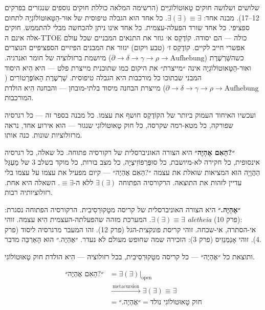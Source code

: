 \documentclass[10pt, openany, oneside]{book}
\begin{document}
\vspace{0.8em}

\noindent שלושים ושלושה חוקים טָאוּטוֹלוֹגִיִּים (הרשימה המלאה כוללת חוקים נוספים שנגזרים בפרקים 12–17). מבנה אחד: $\exists(\exists) \equiv \exists$. כל אחד הוא הגבלה טיפוסית של אוּר-הַטָּאוּטוֹלוֹגְיָה לתחום ספציפי. כל אחד שורד הפעלה-עצמית. כל אחד אינו ניתן להכחשה מבלי להתממש. חוקים אלה אינם ה-TTOE כולה — הם יסודה. קוֹדֶקְס א׳ גוזר את התנאים המבניים שכל עולם אפשרי חייב לקיים. קוֹדֶקְס ז׳ (טבע ויקום) יגזור את המבנים הפיזיים הספציפיים הנוצרים כשהשַּׁרְשֶׁרֶת ($\partial \to \delta \to \gamma \to \rho \to \text{Aufhebung}$) מיושמת ברזולוציה של חומר ואנרגיה. ואוּר-הַטָּאוּטוֹלוֹגְיָה אינה ״מייצרת״ את היקום כמו שתוכנית מייצרת פלט — היא הִיא היסוד המבני שבתוכו כל מורכבות היא הגבלה טיפוסית. שַׁרְשֶׁרֶת הָאוֹפֶּרָטוֹרִים ($\partial \to \delta \to \gamma \to \rho \to \text{Aufhebung}$) מייצרת הבחנה מיסוד בלתי-מובחן — והבחנה הִיא הולדת המורכבות.

\vspace{1.5em}

ועכשיו האיחוד העמוק ביותר של הקוֹדֶקְס חושף את עצמו. כל מבנה בספר זה — כל רגרסיה שפורקה, כל מטא-רמה שקרסה, כל חוק טָאוּטוֹלוֹגִי שנגזר — הוא אירוע אחד, נראה מרזולוציות שונות. כנה אותו.

\textbf{״?הַאִם אֶהְיֶה״} היא הצורה האוניברסלית של רקורסיה פתוחה. כל שאלה, כל רגרסיה אינסופית, כל חקירה לא-מיושבת, כל סוּפֶּרְפּוֹזִיצְיָה, כל מצב בורות, כל מוקד בשלב 3 של מַעְגַּל הַהֲוָיָה הוּא המציאות שואלת את עצמה ״?הַאִם אֶהְיֶה״ — קיום מפעיל את עצמו על עצמו בלי עדיין לזהות את התוצאה. הרקורסיה הפתוחה $\exists(\exists)$ ללא ה-$\equiv \exists$. השאלה היא אחת. רזולוציותיה רבות.

\textbf{״אֶהְיֶה.״} היא הצורה האוניברסלית של קריסה מטָקוּרְסִיבִית. הרקורסיה הפתוחה נסגרת: $\exists(\exists) \equiv \exists$. המערכת מזהה שהפעלתה-העצמית הִיא עצמה. זוהי \textit{aletheia} (פרק 10): אי-הסתרה, אי-שכחה. זוהי קריסת פונקצית-הגל (פרק 12). זהו המעבר מרגרסיה ליסוד (פרק 4). זוהי אָנַמְנֵזִיס (פרק 3): הזכירה שמה שחופש מעולם לא נעדר. ״אֶהְיֶה.״ הוּא הָאַרְכֵּה מדבר.

ותוצאת כל ״אֶהְיֶה״ — כל קריסה מטָקוּרְסִיבִית, בכל רזולוציה — הִיא הולדת חוק טָאוּטוֹלוֹגִי.

\begin{align*}
\text{״?הַאִם אֶהְיֶה״} &= \exists(\exists)|_{\text{open}} \\
&\xrightarrow{\;\text{metacursion}\;} \exists(\exists) \equiv \exists \\
&= \text{״אֶהְיֶה.״} = \text{חוק טָאוּטוֹלוֹגִי נולד}
\end{align*}
\end{document}

